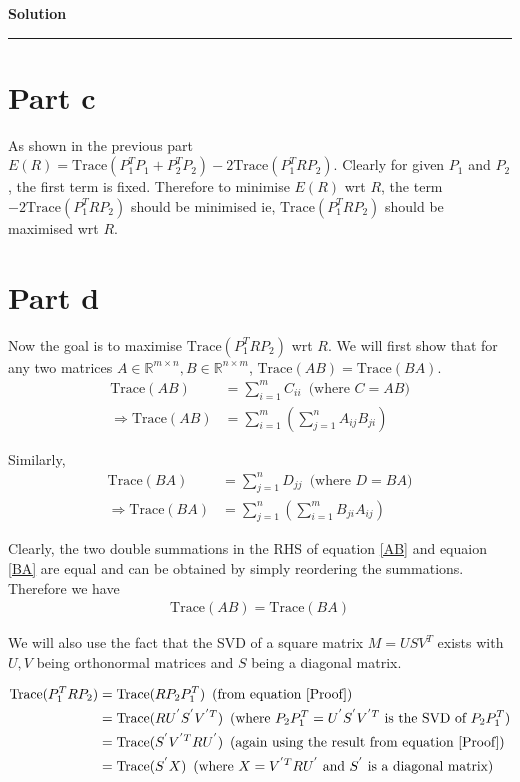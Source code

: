 \documentclass[a4paper,14pt]{article}
\newenvironment{solution}[2][]{%
    \begin{mdframed}[linecolor=blue!70!black, linewidth=2pt, roundcorner=10pt, backgroundcolor=yellow!10!white, skipabove=12pt, skipbelow=12pt]%
        \textbf{\large #2}
        \par\noindent\rule{\textwidth}{0.4pt}
}{
    \end{mdframed}
}
\begin{document}
\begin{solution}{Solution}
    \section{Part c}
    As shown in the previous part $E(R) = \text{Trace}(P_{1}^{T}P_{1} + P_{2}^{T}P_{2}) - 2\text{Trace}(P_{1}^{T}RP_{2})$. Clearly
    for given $P_{1}$ and $P_{2}$, the first term is fixed. Therefore to minimise $E(R)$ wrt $R$, the term 
    $-2\text{Trace}(P_{1}^{T}RP_{2})$ should be minimised ie, $\text{Trace}(P_{1}^{T}RP_{2})$ should be maximised wrt $R$.

    \section{Part d}

    Now the goal is to maximise $\text{Trace}(P_{1}^{T}RP_{2})$ wrt $R$.
    We will first show that for any two matrices $A \in \mathbb{R}^{m \times n},B \in \mathbb{R}^{n \times m}$, 
    $\text{Trace}(AB) = \text{Trace}(BA)$.
    \begin{align}
      \text{Trace}(AB) &= \sum\limits_{i = 1}^{m} C_{ii} \, \text{ (where $C = AB$)} \nonumber \\
      \Rightarrow \label{AB} \text{Trace}(AB) &= \sum\limits_{i = 1}^{m} \left(\sum\limits_{j = 1}^{n} A_{ij} B_{ji}\right) 
    \end{align}

    Similarly, 
    \begin{align}
      \text{Trace}(BA) &= \sum\limits_{j = 1}^{n} D_{jj} \, \text{ (where $D = BA$)} \nonumber\\
      \Rightarrow \label{BA}  \text{Trace}(BA) &= \sum\limits_{j = 1}^{n} \left( \sum\limits_{i = 1}^{m} B_{ji} A_{ij}\right)
    \end{align}

    Clearly, the two double summations in the RHS of equation \@\ref{AB} and equaion \@\ref{BA} are equal
    and can be obtained by simply reordering the summations. Therefore we have 
    \begin{align}
      \label{Proof}\text{Trace}(AB) = \text{Trace}(BA)
    \end{align}

    We will also use the fact that the SVD of a square matrix $M = USV^{T}$ exists with $U,V$ being orthonormal matrices 
    and $S$ being a diagonal matrix.

    \begin{align*}
      \text{Trace}(P_{1}^{T}RP_{2}) &= \text{Trace}(RP_{2}P_{1}^{T}) \, \text{ (from equation \@\ref{Proof})} \\
                                    &= \text{Trace}(R U^{'} S^{'} V^{'T}) \, \text{ (where $P_{2}P_{1}^{T} = U^{'} S^{'} V^{'T}$ is the SVD of $P_{2}P_{1}^{T}$)} \\
                                    &= \text{Trace}(S^{'} V^{'T} R U^{'}) \, \text{ (again using the result from equation \@\ref{Proof})} \\
                                    &= \text{Trace}(S^{'} X) \, \text{ (where $X = V^{'T} R U^{'}$ and $S^{'}$ is a diagonal matrix)}
    \end{align*}


\end{solution}
\end{document}
